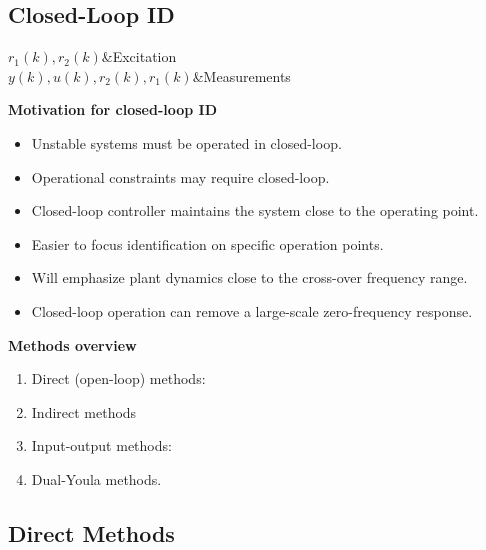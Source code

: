 \documentclass[10pt,a4paper]{scrartcl}
\begin{document}
\begin{multicols*}{2}
\section{Closed-Loop ID}


\begin{TDefinitionTable*}
$r_1(k),r_2(k)$&Excitation\\
$y(k),u(k),r_2(k),r_1(k)$&Measurements\\
\end{TDefinitionTable*}


\textbf{Motivation for closed-loop ID}

\begin{itemize}
\item Unstable systems must be operated in closed-loop.
\item Operational constraints may require closed-loop.
\item Closed-loop controller maintains the system close to the operating point.
\item Easier to focus identification on specific operation points.
\item Will emphasize plant dynamics close to the cross-over frequency range.
\item Closed-loop operation can remove a large-scale zero-frequency response.
\end{itemize}

\textbf{Methods overview}

\begin{enumerate}
\item Direct (open-loop) methods:


\item Indirect methods


\item Input-output methods:


\item Dual-Youla methods.
\end{enumerate}

\subsection{Direct Methods}


\end{multicols*}
\end{document}
